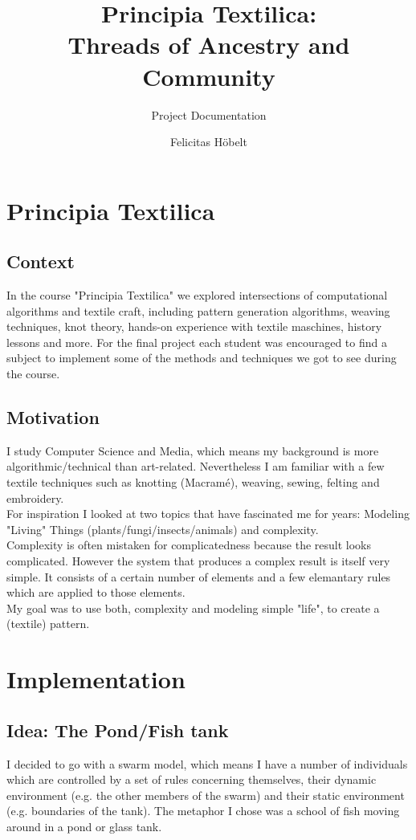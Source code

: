 \documentclass{scrartcl}
\title{Principia Textilica:\\ Threads of Ancestry and Community}
\subtitle{Project Documentation}
\author{Felicitas Höbelt}
\begin{document}
\maketitle

\section{Principia Textilica}

\subsection{Context}
In the course "Principia Textilica" we explored intersections of computational algorithms and textile craft, including pattern generation algorithms, weaving techniques, knot theory, hands-on experience with textile maschines, history lessons and more.
For the final project each student was encouraged to find a subject to implement some of the methods and techniques we got to see during the course.

\subsection{Motivation}

I study Computer Science and Media, which means my background is more algorithmic/technical than art-related.
Nevertheless I am familiar with a few textile techniques such as knotting (Macramé), weaving, sewing, felting and embroidery.\\
For inspiration I looked at two topics that have fascinated me for years: Modeling "Living" Things (plants/fungi/insects/animals) and complexity.\\
Complexity is often mistaken for complicatedness because the result looks complicated.
However the system that produces a complex result is itself very simple. It consists of a certain number of elements and a few elemantary rules which are applied to those elements.\\
My goal was to use both, complexity and modeling simple "life", to create a (textile) pattern.

\section{Implementation}

\subsection{Idea: The Pond/Fish tank}
I decided to go with a swarm model, which means I have a number of individuals which are controlled by a set of rules concerning themselves, their dynamic environment (e.g. the other members of the swarm) and their static environment (e.g. boundaries of the tank).
The metaphor I chose was a school of fish moving around in a pond or glass tank.
\end{document}
